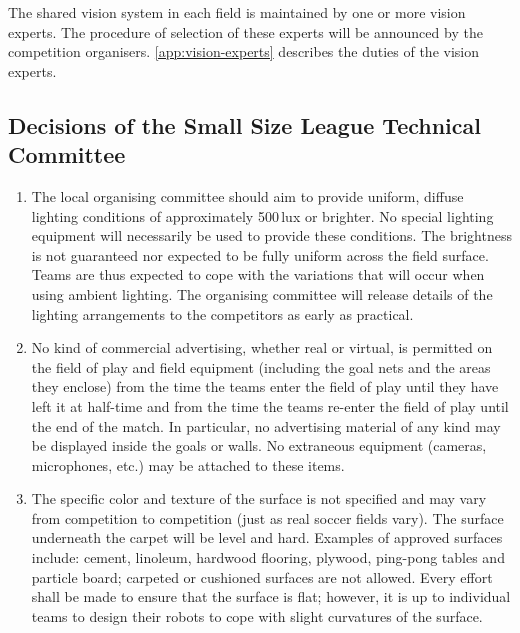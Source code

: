 The shared vision system in each field is maintained by one or more vision experts.
The procedure of selection of these experts will be announced by the competition organisers.
\autoref{app:vision-experts} describes the duties of the vision experts.

\subsection*{Decisions of the Small Size League Technical Committee}
\begin{enumerate}
\item
The local organising committee should aim to provide uniform, diffuse lighting conditions of approximately 500\,lux or brighter.
No special lighting equipment will necessarily be used to provide these conditions.
The brightness is not guaranteed nor expected to be fully uniform across the field surface.
Teams are thus expected to cope with the variations that will occur when using ambient lighting.
The organising committee will release details of the lighting arrangements to the competitors as early as practical.

\item
No kind of commercial advertising, whether real or virtual, is permitted on the field of play and field equipment (including the goal nets and the areas they enclose) from the time the teams enter the field of play until they have left it at half-time and from the time the teams re-enter the field of play until the end of the match.
In particular, no advertising material of any kind may be displayed inside the goals or walls.
No extraneous equipment (cameras, microphones, etc.) may be attached to these items.

\item
The specific color and texture of the surface is not specified and may vary from competition to competition (just as real soccer fields vary).
The surface underneath the carpet will be level and hard.
Examples of approved surfaces include: cement, linoleum, hardwood flooring, plywood, ping-pong tables and particle board; carpeted or cushioned surfaces are not allowed.
Every effort shall be made to ensure that the surface is flat; however, it is up to individual teams to design their robots to cope with slight curvatures of the surface.
\end{enumerate}
